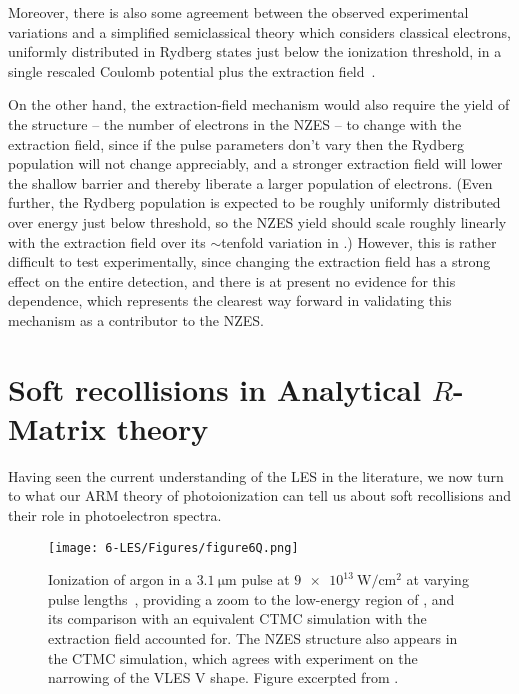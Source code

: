 Moreover, there is also some agreement between the observed experimental variations and a simplified semiclassical theory which considers classical electrons, uniformly distributed in Rydberg states just below the ionization threshold, in a single rescaled Coulomb potential plus the extraction field~\cite{Rost_latest}.



On the other hand, the extraction-field mechanism would also require the yield of the structure -- the number of electrons in the NZES -- to change with the extraction field, since if the pulse parameters don't vary then the Rydberg population will not change appreciably, and a stronger extraction field will lower the shallow barrier and thereby liberate a larger population of electrons. (Even further, the Rydberg population is expected to be roughly uniformly distributed over energy just below threshold, so the NZES yield should scale roughly linearly with the extraction field over its $\sim$tenfold variation in .) However, this is rather difficult to test experimentally, since changing the extraction field has a strong effect on the entire detection, and there is at present no evidence for this dependence, which represents the clearest way forward in validating this mechanism as a contributor to the NZES.





\section[Soft recollisions in Analytical R-Matrix theory]{Soft recollisions in Analytical $R$-Matrix theory}
\label{sec:ARM-soft-recollisions}

Having seen the current understanding of the LES in the literature, we now turn to what our ARM theory of photoionization can tell us about soft recollisions and their role in photoelectron spectra. 


\begin{figure}[b!]
  \centering
  \texttt{[image: 6-LES/Figures/figure6Q.png]}
  \caption[
  Photoelectron momentum maps from measurements and CTMC simulations, showing a narrowing of the VLES V shape for longer pulses, together with a NZES-like structure, as observed by B. Wolter et al.
  ]{
  Ionization of argon in a $\SI{3.1}{\micro\meter}$ pulse at $\SI{9e13}{\watt/\centi\meter^2}$ at varying pulse lengths~\cite{ZES_paper}, providing a zoom to the low-energy region of , and its comparison with an equivalent CTMC simulation with the extraction field accounted for. The NZES structure also appears in the CTMC simulation, which agrees with experiment on the narrowing of the VLES V shape.
  Figure excerpted from .
  }
\label{f6-wolter-nzes-original-figure}
\end{figure}


